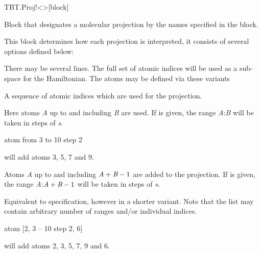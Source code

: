 \begin{fdfentry}{TBT.Proj!<>}[block]

  Block that designates a molecular projection by the names specified
  in the  block.

  This block determines how each projection is interpreted, it
  consists of several options defined below:
  \begin{fdfoptions}
    
    \option[atom]%
    
    There may be several  lines. The full set of atomic
    indices will be used as a sub-space for the Hamiltonian. 
    The atoms may be defined via these variants
    \begin{fdfoptions}
      
      A sequence of atomic indices which are used for the projection.

      Here atoms \emph{A} up to and including \emph{B} are
      used.
      If  is given, the range
      \emph{A}:\emph{B} will be taken in steps of \emph{s}.

      \begin{fdfexample}
        atom from 3 to 10 step 2
      \end{fdfexample}
      will add atoms 3, 5, 7 and 9.

      Atoms \emph{A} up to and including $\emph{A}+\emph{B}-1$
      are added to the projection.
      If  is given, the range
      \emph{A}:$\emph{A}+\emph{B}-1$ will be taken in steps of
      \emph{s}.

      Equivalent to  specification, however in a
      shorter variant. Note that the list may contain arbitrary number
      of ranges and/or individual indices.

      \begin{fdfexample}
        atom [2, 3 -- 10 step 2, 6]
      \end{fdfexample}
      will add atoms 2, 3, 5, 7, 9 and 6.


\end{fdfoptions}
\end{fdfoptions}
\end{fdfentry}

